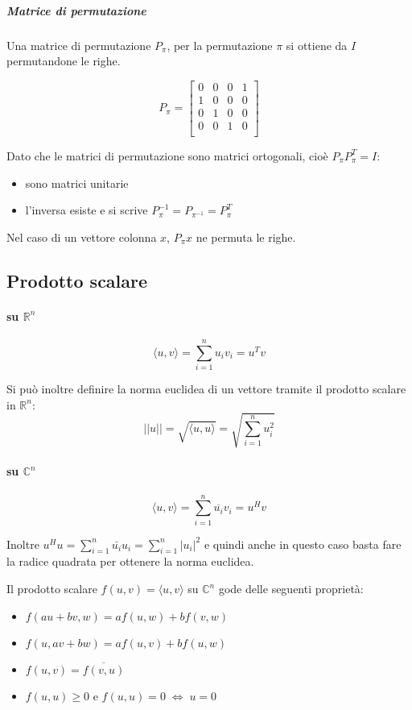 \subparagraph{Matrice di permutazione}
Una matrice di permutazione $P_{\pi}$, per la permutazione $\pi$ 
si ottiene da $I$ permutandone le righe.
\begin{example}
  $$P_{\pi} =
  \begin{bmatrix}
    0 & 0 & 0 & 1  \\
    1 & 0 & 0 & 0  \\
    0 & 1 & 0 & 0  \\
    0 & 0 & 1 & 0  \\
  \end{bmatrix}
  $$
\end{example}

Dato che le matrici di permutazione sono matrici ortogonali, cio\`e
$P_{\pi}P_{\pi}^{T} = I$:

\begin{itemize}
\item sono matrici unitarie
\item l'inversa esiste e si scrive $P_{\pi}^{-1} = P_{\pi^{-1}} = P_{\pi}^{T}$
\end{itemize}

Nel caso di un vettore colonna $x$, $P_{\pi} x$ ne permuta le righe.

\subsection{Prodotto scalare}
\paragraph{su $\mathbb{R}^{n}$}
$$\langle u, v \rangle = \sum_{i=1}^{n} u_{i} v_{i} = u^{T}v$$

Si può inoltre definire la norma euclidea di un vettore tramite il
prodotto scalare in $\mathbb{R}^n$:
$$ || u || = \sqrt{\langle u,u \rangle} = \sqrt{\sum_{i=1}^{n} u_{i}^2} $$

\paragraph{su $\mathbb{C}^{n}$}
$$\langle u, v \rangle = \sum_{i=1}^{n} \overline{u_{i}} v_{i} = u^{H}v$$

Inoltre $u^{H} u = \sum_{i=1}^{n} \bar{u_i}u_i = \sum_{i=1}^{n} |
u_i|^{2}$ e quindi anche in questo caso basta fare la radice quadrata
per ottenere la norma euclidea.
\begin{property}\label{eigenvalues:ei001}
Il prodotto scalare $f(u,v)=\langle u,v \rangle$ su $\mathbb{C}^{n}$ gode
 delle seguenti proprietà:
\begin{itemize}
\item $f(au + bv, w) = af(u,w) + bf(v,w)$
\item $f(u,av + bw) = af(u,v) + bf(u,w)$
\item $f(u,v) = \overline{f(v,u)}$
\item $f(u,u) \geq 0$ \quad e 
       \quad  $f(u,u) = 0 \; \Longleftrightarrow \; u = 0$
\end{itemize}
\end{property}

